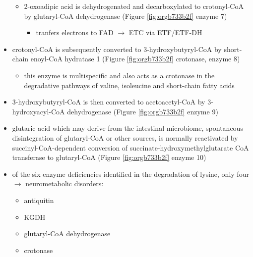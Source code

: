 \documentclass{scrartcl}
\begin{document}
\begin{itemize}
\begin{itemize}
\item 2-oxoadipic acid is dehydrogenated and decarboxylated to
crotonyl-CoA by glutaryl-CoA dehydrogenase (Figure \ref{fig:orgb733b2f} enzyme 7)
\begin{itemize}
\item tranfers electrons to FAD \(\to\) ETC via ETF/ETF-DH
\end{itemize}
\end{itemize}

\item crotonyl-CoA is subsequently converted to 3-hydroxybutyryl-CoA by
short-chain enoyl-CoA hydratase 1 (Figure \ref{fig:orgb733b2f} crotonase, enzyme 8)
\begin{itemize}
\item this enzyme is multispecific and also acts as a crotonase in the
degradative pathways of valine, isoleucine and short-chain fatty
acids
\end{itemize}

\item 3-hydroxybutyryl-CoA is then converted to acetoacetyl-CoA by
3-hydroxyacyl-CoA dehydrogenase (Figure \ref{fig:orgb733b2f} enzyme 9)
\item glutaric acid which may derive from the intestinal microbiome,
spontaneous disintegration of glutaryl-CoA or other sources, is
normally reactivated by succinyl-CoA-dependent conversion of
succinate-hydroxymethylglutarate CoA transferase to glutaryl-CoA
(Figure \ref{fig:orgb733b2f} enzyme 10)

\item of the six enzyme deficiencies identified in the degradation of
lysine, only four \(\to\) neurometabolic disorders:
\begin{itemize}
\item antiquitin
\item KGDH
\item glutaryl-CoA dehydrogenase
\item crotonase
\end{itemize}
\end{itemize}
\end{document}
